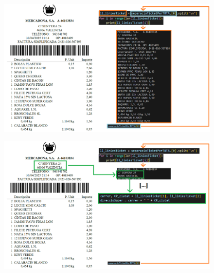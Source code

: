 \documentclass{beamer}
\begin{document}
		\begin{frame}
			\begin{figure}
				\centering
				\includegraphics[width=1\linewidth]{imgEspecifiques/ticketExtraccioG.png}
				\label{fig:ticketExtraccioG}
			\end{figure}
		\end{frame}
		
	
				
		\begin{frame}
			\begin{figure}
				\centering
				\includegraphics[width=1\linewidth]{imgEspecifiques/ticketExtraccioH.png}
				\label{fig:ticketExtraccioH}
			\end{figure}
		\end{frame}
		
\end{document}
